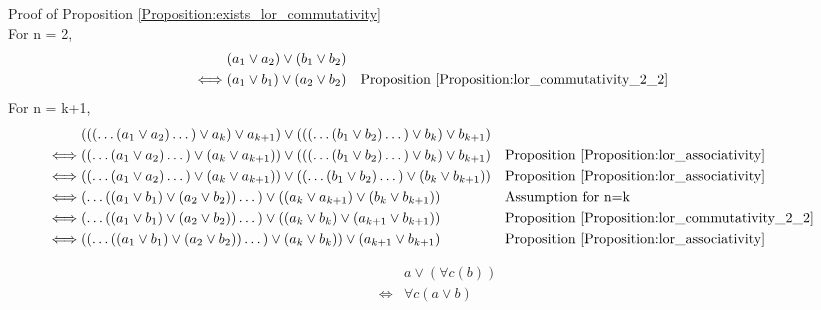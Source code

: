 Proof of Proposition \ref{Proposition:exists_lor_commutativity} \\
For n = 2,
\begin{align*}
& (a_1 \lor a_2) \lor (b_1 \lor b_2) \\
\iff & (a_1 \lor b_1) \lor (a_2 \lor b_2)
& & \text{Proposition \ref{Proposition:lor_commutativity_2_2}} \\
\end{align*}
For n = k+1,
\begin{align*}
& ((( \dots (a_1 \lor a_2) \dots ) \lor a_k) \lor a_{k+1}) \lor ((( \dots (b_1 \lor b_2) \dots ) \lor b_k ) \lor b_{k+1}) \\
\iff & (( \dots (a_1 \lor a_2) \dots ) \lor (a_k \lor a_{k+1})) \lor ((( \dots (b_1 \lor b_2) \dots ) \lor b_k ) \lor b_{k+1})
& & \text{Proposition \ref{Proposition:lor_associativity}} \\
\iff & (( \dots (a_1 \lor a_2) \dots ) \lor (a_k \lor a_{k+1})) \lor (( \dots (b_1 \lor b_2) \dots ) \lor (b_k \lor b_{k+1}))
& & \text{Proposition \ref{Proposition:lor_associativity}} \\
\iff & ( \dots ((a_1 \lor b_1) \lor (a_2 \lor b_2)) \dots ) \lor ((a_k \lor a_{k+1}) \lor (b_k \lor b_{k+1}))
& & \text{Assumption for n=k} \\
\iff & ( \dots ((a_1 \lor b_1) \lor (a_2 \lor b_2)) \dots ) \lor ((a_k \lor b_k) \lor (a_{k+1} \lor b_{k+1}))
& & \text{Proposition \ref{Proposition:lor_commutativity_2_2}} \\
\iff & (( \dots ((a_1 \lor b_1) \lor (a_2 \lor b_2)) \dots ) \lor (a_k \lor b_k)) \lor (a_{k+1} \lor b_{k+1})
& & \text{Proposition \ref{Proposition:lor_associativity}} \\
\end{align*}

\begin{prop}
\label{Proposition:lor_forall_distributivity}
\begin{align*}
& a \lor (\forall c (b)) \\
\iff & \forall c (a \lor b)
\end{align*}
\end{prop}

